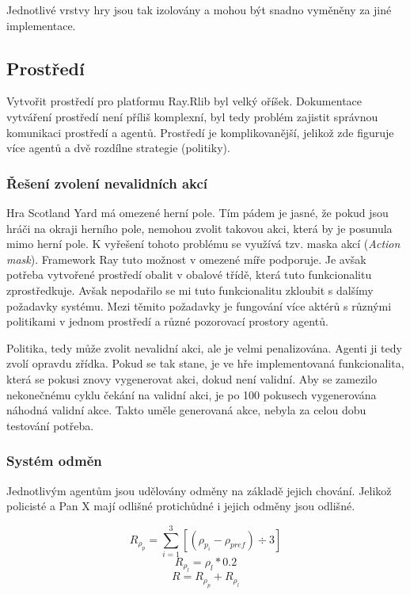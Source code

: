 Jednotlivé vrstvy hry jsou tak izolovány a mohou být snadno vyměněny za jiné implementace.

\subsection{Prostředí}
Vytvořit prostředí pro platformu Ray.Rlib byl velký oříšek.
Dokumentace vytváření prostředí není příliš komplexní, byl tedy problém zajistit správnou komunikaci prostředí a agentů.
Prostředí je komplikovanější, jelikož zde figuruje více agentů a dvě rozdílne strategie (politiky).

\subsubsection*{Řešení zvolení nevalidních akcí}

Hra Scotland Yard má omezené herní pole.
Tím pádem je jasné, že pokud jsou hráči na okraji herního pole, nemohou zvolit takovou akci, která by je posunula mimo herní pole.
K vyřešení tohoto problému se využívá tzv. maska akcí (\emph{Action mask}).
Framework Ray tuto možnost v omezené míře podporuje.
Je avšak potřeba vytvořené prostředí obalit v obalové třídě, která tuto funkcionalitu zprostředkuje.
Avšak nepodařilo se mi tuto funkcionalitu zkloubit s dalšímy požadavky systému.
Mezi těmito požadavky je fungování více aktérů s různými politikami v jednom prostředí a různé pozorovací prostory agentů.

Politika, tedy může zvolit nevalidní akci, ale je velmi penalizována.
Agenti ji tedy zvolí opravdu zřídka.
Pokud se tak stane, je ve hře implementovaná funkcionalita, která se pokusi znovy vygenerovat akci, dokud není validní.
Aby se zamezilo nekonečnému cyklu čekání na validní akci, je po 100 pokusech vygenerována náhodná validní akce.
Takto uměle generovaná akce, nebyla za celou dobu testování potřeba.

\subsubsection*{Systém odměn}

Jednotlivým agentům jsou udělovány odměny na základě jejich chování.
Jelikož policisté a Pan X mají odlišné protichůdné i jejich odměny jsou odlišné.

\begin{equation}
  R_{\rho_p} = \sum_{i=1}^{3}[(\rho_{p_i} - \rho_{pref}) \div 3]
\end{equation}
  \begin{equation}
  R_{\rho_l} = \rho_l * 0.2
\end{equation}
  \begin{equation}
  R = R_{\rho_p} + R_{\rho_l}
\end{equation}

